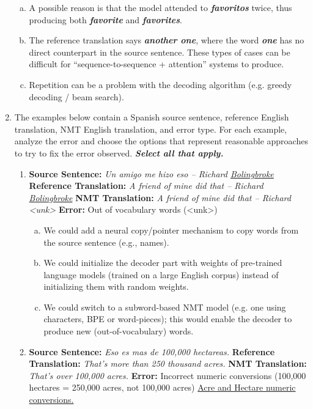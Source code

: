 \begin{enumerate}[1.]
\begin{enumerate}[(a)]
\item A possible reason is that the model attended to {\bf {\em favoritos}} twice, thus producing both {\bf {\em favorite}} and {\bf {\em favorites}}.
\item The reference translation says {\bf {\em another one}}, where the word {\bf {\em one}} has no direct counterpart in the source sentence. These types of cases can be difficult for ``sequence-to-sequence + attention'' systems to produce.
\item Repetition can be a problem with the decoding algorithm (e.g. greedy decoding / beam search).
\end{enumerate}


\item
The examples below contain a Spanish source sentence, reference English translation, NMT English translation, and error type. For each example, analyze the error and choose the options that represent reasonable approaches to try to fix the error observed. {\bf {\em Select all that apply.}}

\begin{enumerate}[3a.]
\item {}
{\bf Source Sentence:} {\em Un amigo me hizo eso -- Richard \underline{Bolingbroke}}
{\bf Reference Translation:} {\em A friend of mine did that -- Richard \underline{Bolingbroke}}
{\bf NMT Translation:} {\em A friend of mine did that -- Richard <unk>}
{\bf Error:} Out of vocabulary words (<unk>)

\begin{enumerate}[(a)]
\item We could add a neural copy/pointer mechanism to copy words from the source sentence (e.g., names).
\item We could initialize the decoder part with weights of pre-trained language models (trained on a large English corpus) instead of initializing them with random weights.
\item We could switch to a subword-based NMT model (e.g. one using characters, BPE or word-pieces); this would enable the decoder to produce new (out-of-vocabulary) words.
\end{enumerate}


\item {}
{\bf Source Sentence:} {\em Eso es mas de 100,000 hectareas.}
{\bf Reference Translation:} {\em That's more than 250 thousand acres.}
{\bf NMT Translation:} {\em That's over 100,000 acres.}
{\bf Error:} Incorrect numeric conversions (100,000 hectares = 250,000 acres, not 100,000 acres)
\href{https://www.unitconverters.net/area/acres-to-hectare.htm}{Acre and Hectare numeric conversions.}


\end{enumerate}
\end{enumerate}
